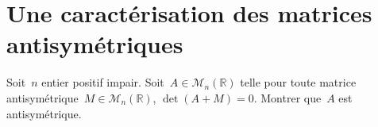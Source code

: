 \section{Une caractérisation des matrices antisymétriques}

Soit~$n$ entier positif impair.
Soit~$A \in \mathcal{M}_{n}(\mathbb{R})$ telle pour toute matrice antisymétrique~$M\in \mathcal{M}_{n}(\mathbb{R})$, $\det(A+M) = 0$. Montrer que~$A$ est antisymétrique.


